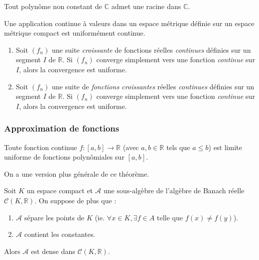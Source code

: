 
  \begin{application}
    Tout polynôme non constant de $\mathbb{C}$ admet une racine dans $\mathbb{C}$.
  \end{application}

  \begin{theorem}[Heine]
    Une application continue à valeurs dans un espace métrique définie sur un espace métrique compact est uniformément continue.
  \end{theorem}


  \begin{theorem}
    \begin{enumerate}[label=(\roman*)]
      \item Soit $(f_n)$ une suite \textit{croissante} de fonctions réelles \textit{continues} définies sur un segment $I$ de $\mathbb{R}$. Si $(f_n)$ converge simplement vers une fonction \textit{continue} sur $I$, alors la convergence est uniforme.
      \item Soit $(f_n)$ une suite de \textit{fonctions croissantes} réelles \textit{continues} définies sur un segment $I$ de $\mathbb{R}$. Si $(f_n)$ converge simplement vers une fonction \textit{continue} sur $I$, alors la convergence est uniforme.
    \end{enumerate}
  \end{theorem}

  \subsubsection{Approximation de fonctions}


  \begin{theorem}[Weierstrass]
    Toute fonction continue $f : [a,b] \rightarrow \mathbb{R}$ (avec $a, b \in \mathbb{R}$ tels que $a \leq b$) est limite uniforme de fonctions polynômiales sur $[a, b]$.
  \end{theorem}

  On a une version plus générale de ce théorème.


  \begin{theorem}
    Soit $K$ un espace compact et $\mathcal{A}$ une sous-algèbre de l'algèbre de Banach réelle $\mathcal{C}(K, \mathbb{R})$. On suppose de plus que :
    \begin{enumerate}[label=(\roman*)]
      \item $\mathcal{A}$ sépare les points de $K$ (ie. $\forall x \in K, \exists f \in A \text{ telle que } f(x) \neq f(y)$).
      \item $\mathcal{A}$ contient les constantes.
    \end{enumerate}
    Alors $\mathcal{A}$ est dense dans $\mathcal{C}(K, \mathbb{R})$.
  \end{theorem}

